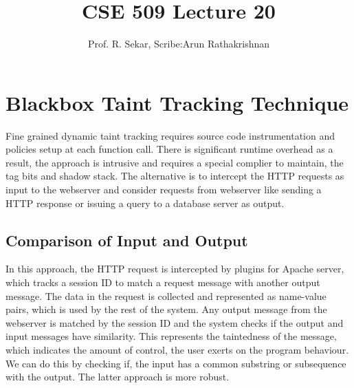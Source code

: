 \documentclass[11pt]{article} %
\title{CSE 509 Lecture 20}
\author{Prof. R. Sekar, Scribe:Arun Rathakrishnan}
\begin{document}
\maketitle
\section {Blackbox Taint Tracking Technique}
Fine grained dynamic taint tracking requires source code instrumentation and 
policies setup at each function call. There is significant runtime overhead 
as a result, the approach is intrusive and requires a special complier to 
maintain, the tag bits and shadow stack. The alternative is to intercept the
HTTP requests as input to the webserver and consider requests from webserver
like sending a HTTP response or issuing a query to a database server as output.
\subsection {Comparison of Input and Output}
In this approach, the HTTP request is intercepted by plugins for Apache server,
which tracks a session ID to match a request message with another output message.
The data in the request is collected and represented as name-value pairs, which
is used by the rest of the system. Any output message from the webserver is matched
by the session ID and the system checks if the output and input messages have
similarity. This represents the taintedness of the message, which indicates the
amount of control, the user exerts on the program behaviour. We can do this
by checking if, the input has a common substring or subsequence with the output.
The latter approach is more robust.
\end{document}
